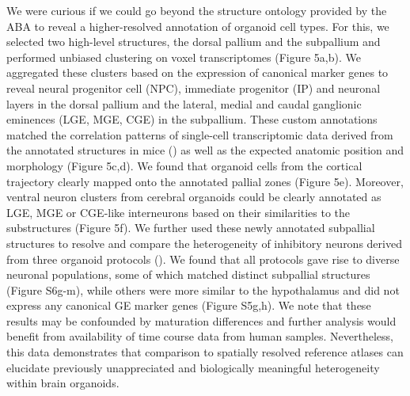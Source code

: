 We were curious if we could go beyond the structure ontology provided by the ABA to reveal a higher-resolved annotation of organoid cell types. For this, we selected two high-level structures, the dorsal pallium and the subpallium and performed unbiased clustering on voxel transcriptomes (Figure 5a,b). We aggregated these clusters based on the expression of canonical marker genes to reveal neural progenitor cell (NPC), immediate progenitor (IP) and neuronal layers in the dorsal pallium and the lateral, medial and caudal ganglionic eminences (LGE, MGE, CGE) in the subpallium. These custom annotations matched the correlation patterns of single-cell transcriptomic data derived from the annotated structures in mice (\cite{loo_single-cell_2019,mayer_developmental_2018}) as well as the expected anatomic position and morphology (Figure 5c,d). We found that organoid cells from the cortical trajectory clearly mapped onto the annotated pallial zones (Figure 5e). Moreover, ventral neuron clusters from cerebral organoids could be clearly annotated as LGE, MGE or CGE-like interneurons based on their similarities to the substructures (Figure 5f). We further used these newly annotated subpallial structures to resolve and compare the heterogeneity of inhibitory neurons derived from three organoid protocols (\cite{birey_assembly_2017,kanton_organoid_2019,xiang_hesc-derived_2019}). We found that all protocols gave rise to diverse neuronal populations, some of which matched distinct subpallial structures (Figure S6g-m), while others were more similar to the hypothalamus and did not express any canonical GE marker genes (Figure S5g,h). We note that these results may be confounded by maturation differences and further analysis would benefit from availability of time course data from human samples. Nevertheless, this data demonstrates that comparison to spatially resolved reference atlases can elucidate previously unappreciated and biologically meaningful heterogeneity within brain organoids.


